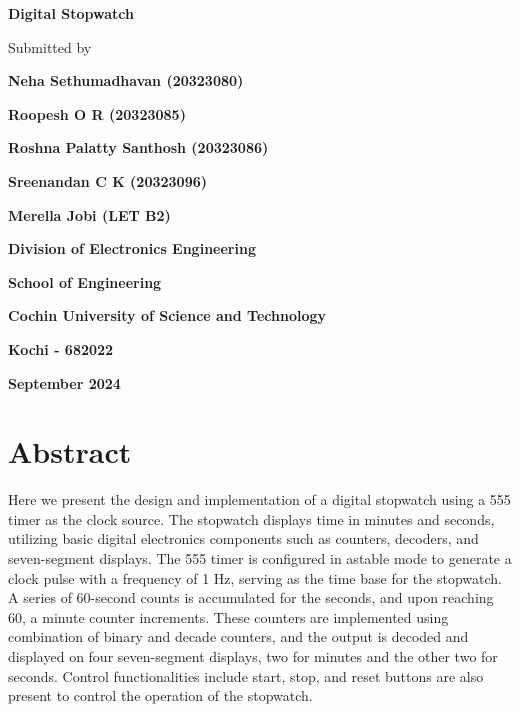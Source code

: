\documentclass[12pt, a4paper]{article}
\begin{document}
\begin{titlepage}
	\centering

	{\huge \textbf{Digital Stopwatch} \par}

	\vspace{1.5cm}

	{\large Submitted by \par}

	\vspace{.5cm}

	{\large \textbf{Neha Sethumadhavan (20323080)}\par}
	{\large \textbf{Roopesh O R (20323085)}\par}
	{\large \textbf{Roshna Palatty Santhosh (20323086)}\par}
	{\large \textbf{Sreenandan C K (20323096)}\par}
	{\large \textbf{Merella Jobi (LET B2)}\par}

	\vspace{2cm}

 	\par

	\vspace{.1cm}

	{\textbf{Division of Electronics Engineering} \par}
	{\textbf{School of Engineering} \par}
	{\textbf{Cochin University of Science and Technology} \par}
	{\textbf{Kochi - 682022} \par}

	\vspace{.5cm}

	{\textbf{September 2024} \par}

	\vfill

\end{titlepage}
\setlength{\parskip}{5pt}%
\thispagestyle{empty}
\addtocounter{page}{-1}
\section*{\Large Abstract}
\vspace{.5cm}
Here we present the design and implementation of a digital stopwatch using a 555 timer as the clock source. The stopwatch displays time in minutes and seconds, utilizing basic digital electronics components such as counters, decoders, and seven-segment displays. The 555 timer is configured in astable mode to generate a clock pulse with a frequency of 1 Hz, serving as the time base for the stopwatch. A series of 60-second counts is accumulated for the seconds, and upon reaching 60, a minute counter increments. These counters are implemented using combination of binary and decade counters, and the output is decoded and displayed on four seven-segment displays, two for minutes and the other two for seconds.
Control functionalities include start, stop, and reset buttons are also present to control the operation of the stopwatch.
\vspace*{2cm}
\end{document}
